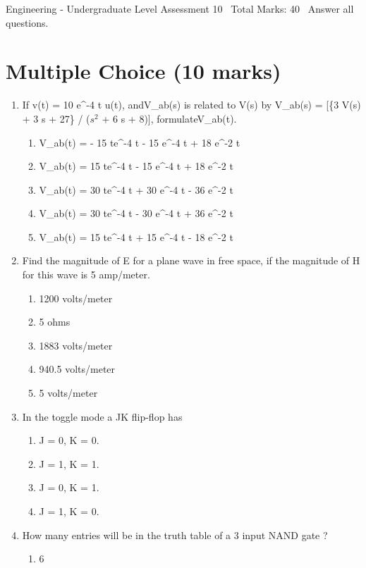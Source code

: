 \documentclass[12pt]{article}
\begin{document}
\begin{center}
Engineering - Undergraduate Level Assessment 10 \
Total Marks: 40 \
Answer all questions.
\end{center}

\section*{Multiple Choice (10 marks)}
\begin{enumerate}[label=\arabic*.]
\item If v(t) = 10 e^-4 t u(t), andV\_ab(s) is related to V(s) by V\_ab(s) = [\{3 V(s) + 3 s + 27\} / ($s^2$ + 6 s + 8)], formulateV\_ab(t).
\begin{enumerate}[label=(\alph*)]
    \item V\_ab(t) = - 15 te^-4 t - 15 e^-4 t + 18 e^-2 t
    \item V\_ab(t) = 15 te^-4 t - 15 e^-4 t + 18 e^-2 t
    \item V\_ab(t) = 30 te^-4 t + 30 e^-4 t - 36 e^-2 t
    \item V\_ab(t) = 30 te^-4 t - 30 e^-4 t + 36 e^-2 t
    \item V\_ab(t) = 15 te^-4 t + 15 e^-4 t - 18 e^-2 t
\end{enumerate}
\item Find the magnitude of E for a plane wave in free space, if the magnitude of H for this wave is 5 amp/meter.
\begin{enumerate}[label=(\alph*)]
    \item 1200 volts/meter
    \item 5 ohms
    \item 1883 volts/meter
    \item 940.5 volts/meter
    \item 5 volts/meter
\end{enumerate}
\item In the toggle mode a JK flip-flop has
\begin{enumerate}[label=(\alph*)]
    \item J = 0, K = 0.
    \item J = 1, K = 1.
    \item J = 0, K = 1.
    \item J = 1, K = 0.
\end{enumerate}
\item How many entries will be in the truth table of a 3 input NAND gate ?
\begin{enumerate}[label=(\alph*)]
    \item 6

\end{enumerate}
\end{enumerate}
\end{document}
